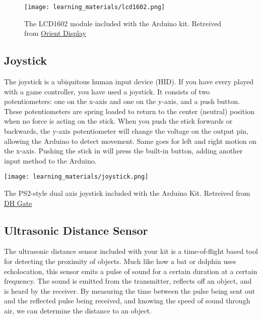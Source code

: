     \begin{figure}[h!]
        \texttt{[image: learning\_materials/lcd1602.png]}
        \caption[LCD Module]{The LCD1602 module included with the Arduino kit. 
        Retreived from \href{https://www.orientdisplay.com/wp-content/uploads/2020/08/AMC1602AR-B-B6WTDW-I2C-1.jpg}
        {Orient Display}}
    \end{figure}

    \subsection*{Joystick}
    The joystick is a ubiquitous human input device (HID).
    If you have every played with a game controller, you have used a joystick.
    It consists of two potentiometers: one on the x-axis and one on the y-axis, and a push button.
    These potentiometers are spring loaded to return to the center (neutral) position when no force is acting on the stick.
    When you push the stick forwards or backwards, the y-axis potentiometer will change the voltage on the output pin, allowing the Arduino to detect movement.
    Same goes for left and right motion on the x-axis.
    Pushing the stick in will press the built-in button, adding another input method to the Arduino.

    \begin{marginfigure}[-2in]
        \texttt{[image: learning\_materials/joystick.png]}
        \caption[Joystick]{The PS2-style dual axis joystick included with the Arduino Kit. 
        Retreived from \href{https://www.orientdisplay.com/wp-content/uploads/2020/08/AMC1602AR-B-B6WTDW-I2C-1.jpg}
        {DH Gate}}
    \end{marginfigure}

    \subsection*{Ultrasonic Distance Sensor}
    The ultrasonic distance sensor included with your kit is a time-of-flight based tool for detecting the proximity of objects.
    Much like how a bat or dolphin uses echolocation, this sensor emits a pulse of sound for a certain duration at a certain frequency.
    The sound is emitted from the transmitter, reflects off an object, and is heard by the receiver.
    By measuring the time between the pulse being sent out and the reflected pulse being received, and knowing the speed of sound through air, we can determine the distance to an object.
    
